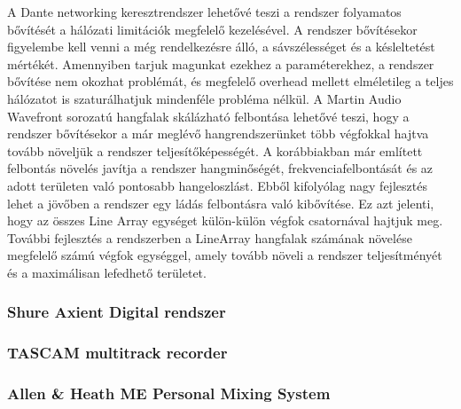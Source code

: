 A Dante networking keresztrendszer lehetővé teszi a rendszer folyamatos bővítését a
hálózati limitációk megfelelő kezelésével. A rendszer bővítésekor figyelembe kell venni a
még rendelkezésre álló, a sávszélességet és a késleltetést mértékét. Amennyiben
tarjuk magunkat ezekhez a paraméterekhez, a rendszer bővítése nem okozhat problémát,
és megfelelő overhead mellett elméletileg a teljes hálózatot is szaturálhatjuk mindenféle probléma nélkül.
A Martin Audio Wavefront sorozatú hangfalak skálázható felbontása lehetővé teszi, hogy
a rendszer bővítésekor a már meglévő hangrendszerünket több végfokkal hajtva tovább
növeljük a rendszer teljesítőképességét. A korábbiakban már említett felbontás növelés
javítja a rendszer hangminőségét, frekvenciafelbontását és az adott területen való
pontosabb hangeloszlást. Ebből kifolyólag nagy fejlesztés lehet a jövőben a rendszer egy ládás
felbontásra való kibővítése. Ez azt jelenti, hogy az összes Line Array egységet külön-külön
végfok csatornával hajtjuk meg.
További fejlesztés a rendszerben a LineArray hangfalak számának növelése megfelelő számú végfok egységgel,
amely tovább növeli a rendszer teljesítményét és a maximálisan lefedhető területet.

\subsubsection{Shure Axient Digital rendszer} %

\subsubsection{TASCAM multitrack recorder} %

\subsubsection{Allen \& Heath ME Personal Mixing System} %



